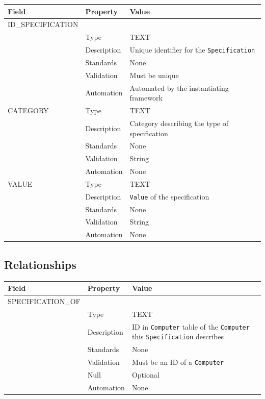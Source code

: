 \documentclass[
]{article}
\newcounter{none} %
\begin{document}
{\def\LTcaptype{none} %
\begin{longtable}[]{@{}lll@{}}
\toprule\noalign{}
Field & Property & Value \\
\midrule\noalign{}
\endhead
\bottomrule\noalign{}
\endlastfoot
ID\_SPECIFICATION & & \\
& Type & TEXT \\
& Description & Unique identifier for the \texttt{Specification} \\
& Standards & None \\
& Validation & Must be unique \\
& Automation & Automated by the instantiating framework \\
CATEGORY & Type & TEXT \\
& Description & Category describing the type of specification \\
& Standards & None \\
& Validation & String \\
& Automation & None \\
VALUE & Type & TEXT \\
& Description & \texttt{Value} of the specification \\
& Standards & None \\
& Validation & String \\
& Automation & None \\
\end{longtable}
}

\subsection{Relationships}\label{relationships-24}

{\def\LTcaptype{none} %
\begin{longtable}[]{@{}
  >{\raggedright\arraybackslash}p{}
  >{\raggedright\arraybackslash}p{}
  >{\raggedright\arraybackslash}p{}@{}}
\toprule\noalign{}
\begin{minipage}[b]{\linewidth}\raggedright
Field
\end{minipage} & \begin{minipage}[b]{\linewidth}\raggedright
Property
\end{minipage} & \begin{minipage}[b]{\linewidth}\raggedright
Value
\end{minipage} \\
\midrule\noalign{}
\endhead
\bottomrule\noalign{}
\endlastfoot
SPECIFICATION\_OF & & \\
& Type & TEXT \\
& Description & ID in \texttt{Computer} table of the \texttt{Computer}
this \texttt{Specification} describes \\
& Standards & None \\
& Validation & Must be an ID of a \texttt{Computer} \\
& Null & Optional \\
& Automation & None \\
\end{longtable}
}
\end{document}
